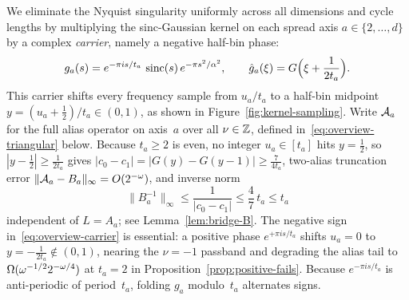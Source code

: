 We eliminate the Nyquist singularity uniformly across all dimensions and cycle lengths by multiplying the sinc-Gaussian kernel on each spread axis $a\in\{2,\dots,d\}$ by a complex \emph{carrier}, namely a negative half-bin phase:
\begin{equation}\label{eq:overview-carrier}
  g_a(s) = e^{-\pi i s/t_a}\,\operatorname{sinc}(s)\,e^{-\pi s^2/\alpha^2}, \qquad \hat g_a(\xi) = G\Bigl(\xi + \frac{1}{2t_a}\Bigr).
\end{equation}
This carrier shifts every frequency sample from $u_a/t_a$ to a half-bin midpoint $y=(u_a+\frac12)/t_a\in(0,1)$, as shown in Figure~\ref{fig:kernel-sampling}. Write $\mathcal{A}_a$ for the full alias operator on axis~$a$ over all $\nu\in\mathbb{Z}$, defined in~\eqref{eq:overview-triangular} below. Because $t_a\ge 2$ is even, no integer $u_a\in[t_a]$ hits $y=\frac12$, so $|y-\frac12|\ge \frac{1}{2t_a}$ gives $|c_0-c_1|=|G(y)-G(y-1)|\ge \frac{7}{4t_a}$, two-alias truncation error $\|\mathcal{A}_a-B_a\|_\infty=O(2^{-\omega})$, and inverse norm
\[
  \|B_a^{-1}\|_\infty \le \frac{1}{|c_0-c_1|} \le \frac47\,t_a \le t_a
\]
independent of $L=A_a$; see Lemma~\ref{lem:bridge-B}. The negative sign in~\eqref{eq:overview-carrier} is essential: a positive phase $e^{+\pi i s/t_a}$ shifts $u_a=0$ to $y=-\frac{1}{2t_a}\notin(0,1)$, nearing the $\nu=-1$ passband and degrading the alias tail to $\Omega(\omega^{-1/2}2^{-\omega/4})$ at $t_a=2$ in Proposition~\ref{prop:positive-fails}. Because $e^{-\pi i s/t_a}$ is anti-periodic of period~$t_a$, folding $g_a$ modulo~$t_a$ alternates signs.

